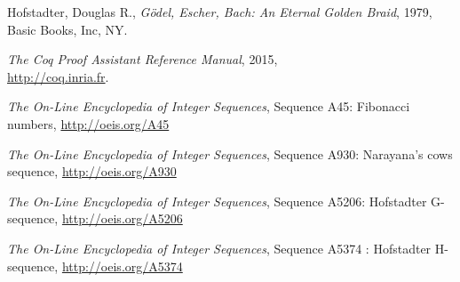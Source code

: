\documentclass[a4paper,11pt]{article}
\begin{document}

\begin{thebibliography}{1}
 Hofstadter, Douglas R.,
 {\it Gödel, Escher, Bach: An Eternal Golden Braid},
 1979, Basic Books, Inc, NY.

 {\it The Coq Proof Assistant Reference Manual}, 2015,\\
 \mbox{\url{http://coq.inria.fr}}.

 {\it The On-Line Encyclopedia of Integer Sequences}, Sequence
 A45: Fibonacci numbers, \url{http://oeis.org/A45}

 {\it The On-Line Encyclopedia of Integer Sequences}, Sequence
 A930: Narayana's cows sequence, \url{http://oeis.org/A930}

 {\it The On-Line Encyclopedia of Integer Sequences}, Sequence
 A5206: Hofstadter G-sequence, \url{http://oeis.org/A5206}

 {\it The On-Line Encyclopedia of Integer Sequences}, Sequence
 A5374 : Hofstadter H-sequence, \url{http://oeis.org/A5374}

\end{thebibliography}
\end{document}
